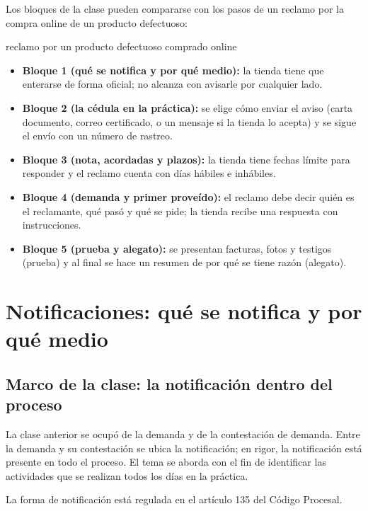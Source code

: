 \documentclass[12pt,oneside]{book}
\begin{document}
Los bloques de la clase pueden compararse con los pasos de un reclamo por la compra online de un producto defectuoso:

\begin{example}{reclamo por un producto defectuoso comprado online}
\begin{itemize}
    \item \textbf{Bloque 1 (qué se notifica y por qué medio):} la tienda tiene que enterarse de forma oficial; no alcanza con avisarle por cualquier lado.
    \item \textbf{Bloque 2 (la cédula en la práctica):} se elige cómo enviar el aviso (carta documento, correo certificado, o un mensaje si la tienda lo acepta) y se sigue el envío con un número de rastreo.
    \item \textbf{Bloque 3 (nota, acordadas y plazos):} la tienda tiene fechas límite para responder y el reclamo cuenta con días hábiles e inhábiles.
    \item \textbf{Bloque 4 (demanda y primer proveído):} el reclamo debe decir quién es el reclamante, qué pasó y qué se pide; la tienda recibe una respuesta con instrucciones.
    \item \textbf{Bloque 5 (prueba y alegato):} se presentan facturas, fotos y testigos (prueba) y al final se hace un resumen de por qué se tiene razón (alegato).
\end{itemize}
\end{example}

\chapter[Notificaciones: qué y por qué medio]{Notificaciones: qué se notifica y por qué medio}

\section{Marco de la clase: la notificación dentro del proceso}

La clase anterior se ocupó de la demanda y de la contestación de demanda. Entre la demanda y su contestación se ubica la notificación; en rigor, la notificación está presente en todo el proceso. El tema se aborda con el fin de identificar las actividades que se realizan todos los días en la práctica.

La forma de notificación está regulada en el artículo 135 del Código Procesal.
\end{document}
